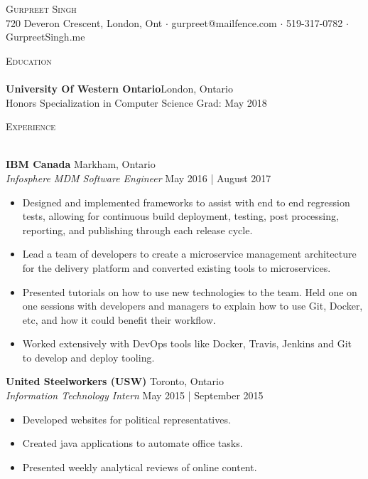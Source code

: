 \documentclass[a4paper]{article}
\newcommand{\lineunder} {
    \vspace*{-8pt} \\
    \hspace*{-18pt} \hrulefill \\
}
\newcommand{\header} [1] {
    {\hspace*{-18pt}\vspace*{6pt} \textsc{#1}}
    \vspace*{-6pt} \lineunder
}
\begin{document}
\vspace*{-40pt}

\vspace*{-10pt}
\begin{center}
	{\Huge \scshape {Gurpreet Singh}}\\
	720 Deveron Crescent, London, Ont $\cdot$ gurpreet@mailfence.com $\cdot$ 519-317-0782 $\cdot$ GurpreetSingh.me\\
\end{center}

\vspace*{2mm}

\header{Education}
\textbf{University Of Western Ontario}\hfill London, Ontario\\
Honors Specialization in Computer Science \hfill Grad: May 2018\\
\vspace{2mm}

\vspace*{2mm}

\header{Experience}
\vspace{1mm}

\textbf{IBM Canada} \hfill Markham, Ontario\\
\textit{Infosphere MDM Software Engineer} \hfill May 2016 | August 2017\\
\vspace{-1mm}
\begin{itemize} \itemsep 1pt
	\item Designed and implemented frameworks to assist with end to end regression tests, allowing for continuous build deployment, testing, post processing, reporting, and publishing through each release cycle.
	\item Lead a team of developers to create a microservice management architecture for the delivery platform and converted existing tools to microservices.
	\item Presented tutorials on how to use new technologies to the team. Held one on one sessions with developers and managers to explain how to use Git, Docker, etc, and how it could benefit their workflow.
	\item Worked extensively with DevOps tools like Docker, Travis, Jenkins and Git to develop and deploy tooling.
\end{itemize}

\textbf{United Steelworkers (USW)} \hfill Toronto, Ontario\\
\textit{Information Technology Intern} \hfill May 2015 | September 2015\\
\vspace{-1mm}
\begin{itemize} \itemsep 1pt
	\item Developed websites for political representatives.
	\item Created java applications to automate office tasks.
	\item Presented weekly analytical reviews of online content.
\end{itemize}
\end{document}
